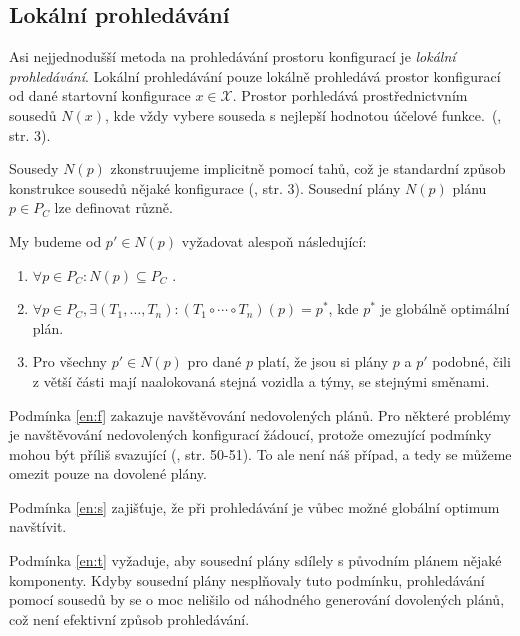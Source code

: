 \subsection{Lokální prohledávání}\label{kap:localSearch}

Asi nejjednodušší metoda na prohledávání prostoru konfigurací je \textit{lokální prohledávání}.
Lokální prohledávání pouze lokálně prohledává prostor konfigurací od dané startovní konfigurace $x \in \mathcal{X}$. 
Prostor porhledává prostřednictvním sousedů $N(x)$, kde vždy vybere souseda s nejlepší hodnotou účelové funkce.~(\citet{HybridMeta}, str. 3).

Sousedy $N(p)$ zkonstruujeme implicitně pomocí tahů, což je standardní způsob konstrukce sousedů nějaké konfigurace (\citet{HybridMeta}, str. 3).
Sousední plány $N(p)$ plánu $p \in P_C$ lze definovat různě. 

My budeme od $p' \in N(p)$ vyžadovat alespoň následující:
\begin{enumerate}\label{enum:sousediNutnost}
  \item $\forall p \in P_C \colon N(p) \subseteq P_C$ \label{en:f}.
  \item $\forall p \in P_C, \exists(T_1, \dots, T_n) \colon (T_1 \circ \cdots \circ T_n)(p) = p^*$, kde $p^*$ je globálně optimální plán. \label{en:s}
  \item Pro všechny $p' \in N(p)$ pro dané $p$ platí, že jsou si plány $p$ a $p'$ podobné, čili z větší části mají naalokovaná stejná vozidla a týmy, se stejnými směnami. \label{en:t}
\end{enumerate}

Podmínka \ref{en:f} zakazuje navštěvování nedovolených plánů. Pro některé problémy je navštěvování nedovolených konfigurací žádoucí,
protože omezující podmínky mohou být příliš svazující (\citet{GlovKoch03}, str. 50-51).
To ale není náš případ, a tedy se můžeme omezit pouze na dovolené plány.

Podmínka  \ref{en:s} zajišťuje, že při prohledávání je vůbec možné globální optimum navštívit.

Podmínka \ref{en:t} vyžaduje, aby sousední plány sdílely s původním plánem nějaké komponenty. 
Kdyby sousední plány nesplňovaly tuto podmínku, prohledávání pomocí sousedů by se o moc nelišilo od náhodného
generování dovolených plánů, což není efektivní způsob prohledávání.

